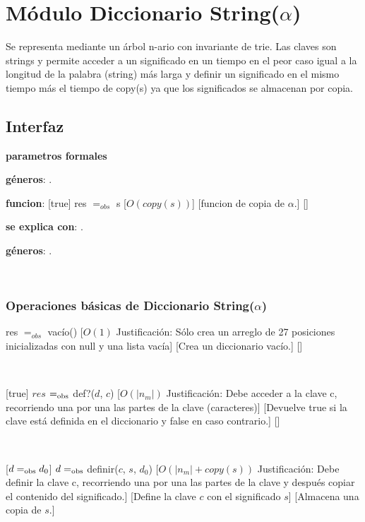 \section{Módulo Diccionario String($\alpha$)}

Se representa mediante un árbol n-ario con invariante de trie. Las claves son strings y permite acceder a un significado en un tiempo en el peor caso igual a la longitud de la palabra (string) más larga y definir un significado en el mismo tiempo más el tiempo
de copy(s) ya que los significados se almacenan por copia.

\subsection{Interfaz}

\textbf{parametros formales}

\textbf{géneros}: \TipoVariable{$\alpha$}.

\textbf{funcion}: 
				  [true]
				  {res $=_{obs}$ s}
				  [$O(copy(s))$]
				  [funcion de copia de $\alpha$.]
				  []

\textbf{se explica con}: .

\textbf{géneros}: .



~

\subsubsection{Operaciones básicas de Diccionario String($\alpha$)}

{res $=_{obs}$ vacío()}
[$O(1)$ Justificación: Sólo crea un arreglo de 27 posiciones inicializadas con null y una lista vacía]
[Crea un diccionario vacío.]
[]

~



[true]
{$res$ $=_{\mathrm{obs}}$ def?($d$, $c$)}
[$O(|n_m|)$ Justificación: Debe acceder a la clave c, recorriendo una por una las partes de la clave (caracteres)]
[Devuelve true si la clave está definida en el diccionario y false en caso contrario.]
[]

~

[$ d =_{\mathrm{obs}} d_0 $]
{$ d =_{\mathrm{obs}}$ definir($c$, $s$, $d_0$)}
[$O(|n_m| + copy(s))$ Justificación: Debe definir la clave c, recorriendo una por una las partes de la clave y después copiar el contenido del significado.]
[Define la clave $c$ con el significado $s$]
[Almacena una copia de $s$.]

